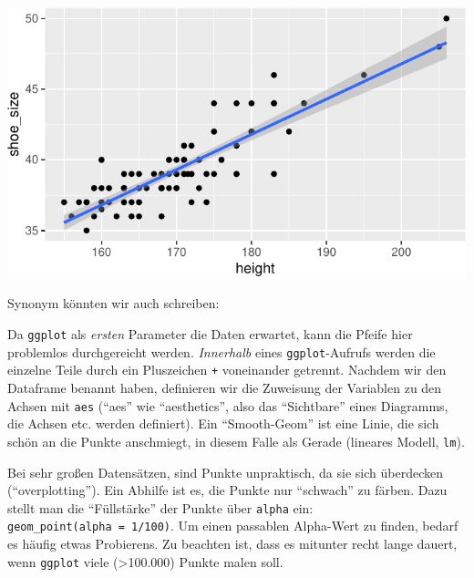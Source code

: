 \documentclass[12pt,ngerman,paper=a4,pagesize,DIV=13]{scrreprt}
\newenvironment{Shaded}{\begin{snugshade}}{\end{snugshade}}
\newcommand{\DataTypeTok}[1]{\textcolor[rgb]{0.13,0.29,0.53}{#1}}
\newcommand{\DecValTok}[1]{\textcolor[rgb]{0.00,0.00,0.81}{#1}}
\newcommand{\KeywordTok}[1]{\textcolor[rgb]{0.13,0.29,0.53}{\textbf{#1}}}
\newcommand{\NormalTok}[1]{#1}
\newcommand{\OperatorTok}[1]{\textcolor[rgb]{0.81,0.36,0.00}{\textbf{#1}}}
\newcommand{\StringTok}[1]{\textcolor[rgb]{0.31,0.60,0.02}{#1}}
\begin{document}
\includegraphics{DatenerhebungStatistik-Uebung_files/figure-latex/unnamed-chunk-247-1.pdf}

Synonym könnten wir auch schreiben:

\begin{Shaded}
\end{Shaded}

Da \texttt{ggplot} als \emph{ersten} Parameter die Daten erwartet, kann
die Pfeife hier problemlos durchgereicht werden. \emph{Innerhalb} eines
\texttt{ggplot}-Aufrufs werden die einzelne Teile durch ein Pluszeichen
\texttt{+} voneinander getrennt. Nachdem wir den Dataframe benannt
haben, definieren wir die Zuweisung der Variablen zu den Achsen mit
\texttt{aes} (\enquote{aes} wie \enquote{aesthetics}, also das
\enquote{Sichtbare} eines Diagramms, die Achsen etc. werden definiert).
Ein \enquote{Smooth-Geom} ist eine Linie, die sich schön an die Punkte
anschmiegt, in diesem Falle als Gerade (lineares Modell, \texttt{lm}).

Bei sehr großen Datensätzen, sind Punkte unpraktisch, da sie sich
überdecken (\enquote{overplotting}). Ein Abhilfe ist es, die Punkte nur
\enquote{schwach} zu färben. Dazu stellt man die \enquote{Füllstärke}
der Punkte über \texttt{alpha} ein:
\texttt{geom\_point(alpha\ =\ 1/100)}. Um einen passablen Alpha-Wert zu
finden, bedarf es häufig etwas Probierens. Zu beachten ist, dass es
mitunter recht lange dauert, wenn \texttt{ggplot} viele
(\textgreater{}100.000) Punkte malen soll.
\end{document}
